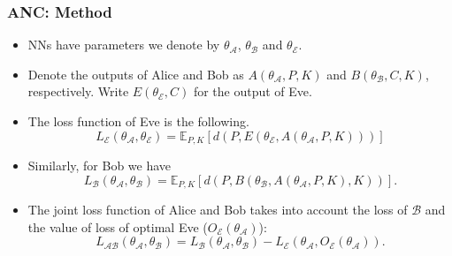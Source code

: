 \documentclass{beamer}
\begin{document}
\begin{frame}
\frametitle{ANC: Method}
\begin{itemize}
\item NNs have parameters we denote by $\theta_{\mathcal{A}}$, $\theta_{\mathcal{B}}$ and $\theta_{\mathcal{E}}$.
\item Denote the outputs of Alice and Bob as $A(\theta_{\mathcal{A}}, P, K)$ and $B(\theta_{\mathcal{B}}, C, K)$, respectively. Write $E(\theta_{\mathcal{E}}, C)$ for the output of Eve.
\item The loss function of Eve is the following.
\begin{equation*}
L_{\mathcal{E}}\left(\theta_{\mathcal{A}}, \theta_{\mathcal{E}}\right) = \mathbb{E}_{P,K} \left[ d\left(P, E(\theta_{\mathcal{E}}, A(\theta_{\mathcal{A}}, P, K) ) \right)\right]
\end{equation*}
\item Similarly, for Bob we have
\begin{equation*}
L_{\mathcal{B}}\left(\theta_{\mathcal{A}}, \theta_{\mathcal{B}}\right) = \mathbb{E}_{P,K}\left[ d\left(P, B(\theta_{\mathcal{B}}, A(\theta_{\mathcal{A}}, P, K), K ) \right)\right]. 
\end{equation*}
\item  The joint loss function of Alice and Bob takes into account the loss of $\mathcal{B}$ and the value of loss of optimal Eve ($O_{\mathcal{E}}\left(\theta_{\mathcal{A}} \right)$):
\begin{equation*}
L_{\mathcal{A}\mathcal{B}}(\theta_{\mathcal{A}}, \theta_{\mathcal{B}}) = L_{\mathcal{B}}\left(\theta_{\mathcal{A}}, \theta_{\mathcal{B}}\right) - L_{\mathcal{E}}(\theta_{\mathcal{A}}, O_{\mathcal{E}}\left(\theta_{\mathcal{A}} \right)).
\end{equation*}
\end{itemize}
\end{frame}
\end{document}
